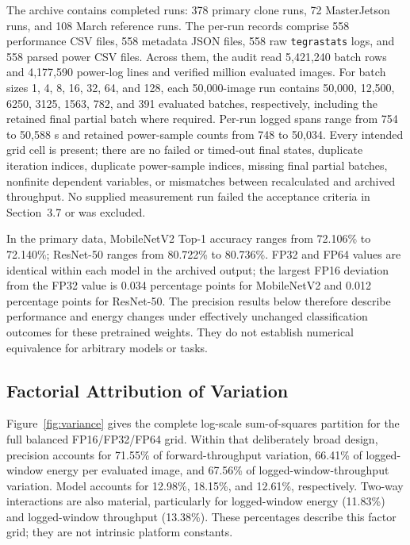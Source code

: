 \documentclass[electronics,article,submit,pdftex,moreauthors]{Definitions/mdpi}
\newcommand{\mobile}{MobileNetV2}
\newcommand{\resnet}{ResNet-50}
\providecommand{\figref}[1]{Figure~\ref{#1}}
\begin{document}
The archive contains \TotalRuns{} completed runs: 378 primary clone runs, 72 MasterJetson runs, and 108 March reference runs. The per-run records comprise 558 performance CSV files, 558 metadata JSON files, 558 raw \texttt{tegrastats} logs, and 558 parsed power CSV files. Across them, the audit read 5,421,240 batch rows and 4,177,590 power-log lines and verified \TotalEvaluatedImagesMillions{} million evaluated images. For batch sizes 1, 4, 8, 16, 32, 64, and 128, each 50,000-image run contains 50,000, 12,500, 6250, 3125, 1563, 782, and 391 evaluated batches, respectively, including the retained final partial batch where required. Per-run logged spans range from 754 to 50,588 s and retained power-sample counts from 748 to 50,034. Every intended grid cell is present; there are no failed or timed-out final states, duplicate iteration indices, duplicate power-sample indices, missing final partial batches, nonfinite dependent variables, or mismatches between recalculated and archived throughput. No supplied measurement run failed the acceptance criteria in Section~3.7 or was excluded.

In the primary data, \mobile{} Top-1 accuracy ranges from 72.106\% to 72.140\%; \resnet{} ranges from 80.722\% to 80.736\%. FP32 and FP64 values are identical within each model in the archived output; the largest FP16 deviation from the FP32 value is 0.034 percentage points for \mobile{} and 0.012 percentage points for \resnet{}. The precision results below therefore describe performance and energy changes under effectively unchanged classification outcomes for these pretrained weights. They do not establish numerical equivalence for arbitrary models or tasks.

\subsection{Factorial Attribution of Variation}

\figref{fig:variance} gives the complete log-scale sum-of-squares partition for the full balanced FP16/FP32/FP64 grid. Within that deliberately broad design, precision accounts for 71.55\% of forward-throughput variation, 66.41\% of logged-window energy per evaluated image, and 67.56\% of logged-window-throughput variation. Model accounts for 12.98\%, 18.15\%, and 12.61\%, respectively. Two-way interactions are also material, particularly for logged-window energy (11.83\%) and logged-window throughput (13.38\%). These percentages describe this factor grid; they are not intrinsic platform constants.
\end{document}
